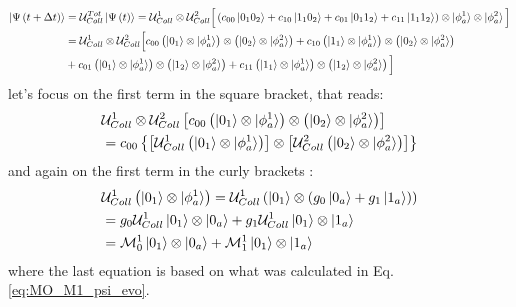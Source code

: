 \documentclass[a4paper,12pt]{article}
\begin{document}
\begin{align}
	\ket{\Psi \left(t + \Delta t\right)} &= \mathcal{U}_{Coll}^{Tot} \ket{\Psi \left(t\right)} = \mathcal{U}_{Coll}^{1} \otimes \mathcal{U}_{Coll}^{2} \Big[ \left( c_{00} \ket{0_{1}0_{2}} + c_{10} \ket{1_{1}0_{2}} + c_{01} \ket{0_{1}1_{2}} + c_{11} \ket{1_{1}1_{2}} \right) \otimes \ket{\phi_{a}^{1}} \otimes \ket{\phi_{a}^{2}} \Big] \notag \\
	& = \mathcal{U}_{Coll}^{1} \otimes \mathcal{U}_{Coll}^{2} \Big[ c_{00} \left(\ket{0_{1}} \otimes \ket{\phi_{a}^{1}} \right) \otimes \left(\ket{0_{2}} \otimes \ket{\phi_{a}^{2}} \right) + c_{10} \left(\ket{1_{1}} \otimes \ket{\phi_{a}^{1}} \right) \otimes \left(\ket{0_{2}} \otimes \ket{\phi_{a}^{2}} \right) \notag \\
	& + c_{01} \left(\ket{0_{1}} \otimes \ket{\phi_{a}^{1}} \right) \otimes \left(\ket{1_{2}} \otimes \ket{\phi_{a}^{2}} \right) + c_{11} \left(\ket{1_{1}} \otimes \ket{\phi_{a}^{1}} \right) \otimes \left(\ket{1_{2}} \otimes \ket{\phi_{a}^{2}} \right) \Big]
	\label{eq:total_kraus_op_derivation_first_part}
\end{align}
let's focus on the first term in the square bracket, that reads:
\begin{align}
	& \mathcal{U}_{Coll}^{1} \otimes \mathcal{U}_{Coll}^{2} \left[ c_{00} \left(\ket{0_{1}} \otimes \ket{\phi_{a}^{1}} \right) \otimes \left(\ket{0_{2}} \otimes \ket{\phi_{a}^{2}} \right) \right] \notag \\
	& = c_{00} \left\{ \left[ \mathcal{U}_{Coll}^{1} \left(\ket{0_{1}} \otimes \ket{\phi_{a}^{1}} \right)\right] \otimes \left[ \mathcal{U}_{Coll}^{2}  \left(\ket{0_{2}} \otimes \ket{\phi_{a}^{2}} \right) \right] \right\} 
	\label{eq:first_term_complete_derivation}
\end{align}
and again on the first term in the curly brackets : 
\begin{align}
	&\mathcal{U}_{Coll}^{1} \left(\ket{0_{1}} \otimes \ket{\phi_{a}^{1}} \right) = \mathcal{U}_{Coll}^{1} \left(\ket{0_{1}} \otimes \left(  g_{0} \ket{0_{a}} + g_{1} \ket{1_{a}}  \right) \right) \notag \\ 
	&= g_{0} \mathcal{U}_{Coll}^{1} \ket{0_{1}} \otimes \ket{0_{a}} + g_{1} \mathcal{U}_{Coll}^{1} \ket{0_{1}} \otimes \ket{1_{a}} \notag \\ 
	& = \mathcal{M}_{0}^{1} \ket{0_{1}} \otimes \ket{0_{a}} + \mathcal{M}_{1}^{1} \ket{0_{1}} \otimes \ket{1_{a}}
	\label{eq:first_first_term_complete_derivation}
\end{align}
where the last equation is based on what was calculated in Eq.\ref{eq:MO_M1_psi_evo}. 
\end{document}
